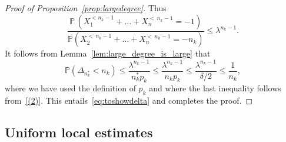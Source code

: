 \documentclass[AHL,Unicode,longabstracts,published]{cedram}
\renewcommand{\P}{\mathbb{P}}
\begin{document}
\begin{proof}[Proof of Proposition~\ref{prop:largedegree}]
Thus
\[
\frac{ \P\,\left(X^{<n_k-1}_1+\dots+X^{<\,n_k-1}_n=-1\right)}{\P\left(X^{<\,n_k-1}_2+\dots+X^{<\,n_k-1}_n=-n_k\right)}\leq \lambda^{n_{k}-1}.
\]
It follows from Lemma~\ref{lem:large_degree_is_large} that
\[
\P\left(\Delta_{n_{k}^*}< n_{k}\right) {\leq \frac{\lambda^{n_{k}-1} }{{n_{k}^*} p_{k}} \leq \frac{ \lambda^{n_{k}-1} }{n_{k} p_{k}} \leq} \frac{ \lambda^{n_{k}-1} }{\delta/2}\leq \frac{1}{n_{k}},
\]
where we have used the definition of $p_{k}$ and where the {last} inequality follows from~\eqref{(2)}. This entails~\eqref{eq:toshowdelta} and completes the proof.
\end{proof}


\subsection{Uniform local estimates}
\end{document}
